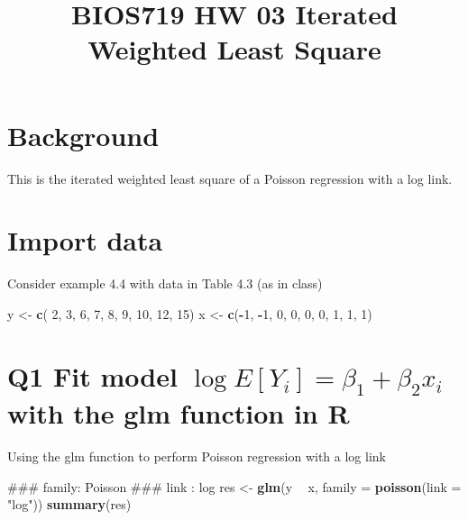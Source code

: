 \documentclass[]{article}
\title{BIOS719 HW 03 \textbar{} Iterated Weighted Least Square}
\author{}
\date{}
\newenvironment{Shaded}{\begin{snugshade}}{\end{snugshade}}
\newcommand{\KeywordTok}[1]{\textcolor[rgb]{0.13,0.29,0.53}{\textbf{#1}}}
\newcommand{\DataTypeTok}[1]{\textcolor[rgb]{0.13,0.29,0.53}{#1}}
\newcommand{\DecValTok}[1]{\textcolor[rgb]{0.00,0.00,0.81}{#1}}
\newcommand{\StringTok}[1]{\textcolor[rgb]{0.31,0.60,0.02}{#1}}
\newcommand{\OperatorTok}[1]{\textcolor[rgb]{0.81,0.36,0.00}{\textbf{#1}}}
\newcommand{\NormalTok}[1]{#1}
\begin{document}
\maketitle

\section{Background}\label{background}

This is the iterated weighted least square of a Poisson regression with
a log link.

\section{Import data}\label{import-data}

Consider example 4.4 with data in Table 4.3 (as in class)

\begin{Shaded}
\begin{Highlighting}[]
\NormalTok{y <-}\StringTok{ }\KeywordTok{c}\NormalTok{( }\DecValTok{2}\NormalTok{,  }\DecValTok{3}\NormalTok{, }\DecValTok{6}\NormalTok{, }\DecValTok{7}\NormalTok{, }\DecValTok{8}\NormalTok{, }\DecValTok{9}\NormalTok{, }\DecValTok{10}\NormalTok{, }\DecValTok{12}\NormalTok{, }\DecValTok{15}\NormalTok{)}
\NormalTok{x <-}\StringTok{ }\KeywordTok{c}\NormalTok{(}\OperatorTok{-}\DecValTok{1}\NormalTok{, }\OperatorTok{-}\DecValTok{1}\NormalTok{, }\DecValTok{0}\NormalTok{, }\DecValTok{0}\NormalTok{, }\DecValTok{0}\NormalTok{, }\DecValTok{0}\NormalTok{,  }\DecValTok{1}\NormalTok{,  }\DecValTok{1}\NormalTok{,  }\DecValTok{1}\NormalTok{)}
\end{Highlighting}
\end{Shaded}

\section{\texorpdfstring{Q1 Fit model
\(\log{E[Y_i]} = \beta_1 + \beta_2 x_i\) with the glm function in
R}{Q1 Fit model \textbackslash{}log\{E{[}Y\_i{]}\} = \textbackslash{}beta\_1 + \textbackslash{}beta\_2 x\_i with the glm function in R}}\label{q1-fit-model-logey_i-beta_1-beta_2-x_i-with-the-glm-function-in-r}

Using the glm function to perform Poisson regression with a log link

\begin{Shaded}
\begin{Highlighting}[]
\NormalTok{### family: Poisson}
\NormalTok{### link  : log}
\NormalTok{res <-}\StringTok{ }\KeywordTok{glm}\NormalTok{(y }\OperatorTok{~}\StringTok{ }\NormalTok{x, }\DataTypeTok{family =} \KeywordTok{poisson}\NormalTok{(}\DataTypeTok{link =} \StringTok{"log"}\NormalTok{))}
\KeywordTok{summary}\NormalTok{(res)}
\end{Highlighting}
\end{Shaded}
\end{document}
